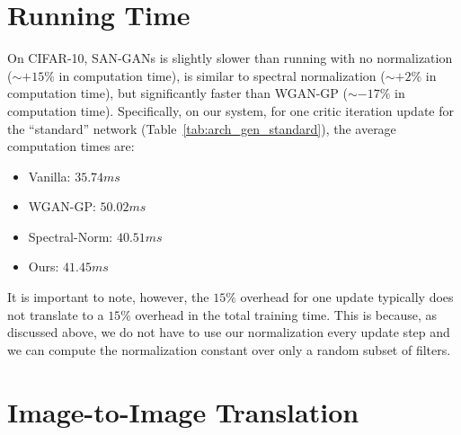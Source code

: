 \section{Running Time}
On CIFAR-10, SAN-GANs is slightly slower than running with no normalization ($\sim +15\%$ in computation time), is similar to spectral normalization ($\sim +2\%$ in computation time), but significantly faster than WGAN-GP ($\sim -17\%$ in computation time). Specifically, on our system, for one critic iteration update for the ``standard'' network (Table~\ref{tab:arch_gen_standard}), the average computation times are:
\begin{itemize}

\vspace{-0.05cm}

\item Vanilla: $35.74ms$
\vspace{-0.05cm}

\item WGAN-GP: $50.02ms$
\vspace{-0.05cm}

\item Spectral-Norm: $40.51ms$
\vspace{-0.05cm}

\item Ours: $41.45ms$

\end{itemize}

It is important to note, however, the $15\%$ overhead for one update typically does not translate to a $15\%$ overhead in the total training time. This is because, as discussed above, we do not have to use our normalization every update step and we can compute the normalization constant over only a random subset of filters. 

\section{Image-to-Image Translation}


